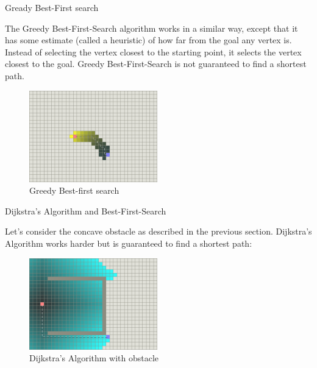 \documentclass[ignorenonframetext,]{beamer}
\begin{document}
\begin{frame}{Gready Best-First search}
\protect\hypertarget{gready-best-first-search}{}

The Greedy Best-First-Search algorithm works in a similar way, except
that it has some estimate (called a heuristic) of how far from the goal
any vertex is. Instead of selecting the vertex closest to the starting
point, it selects the vertex closest to the goal. Greedy
Best-First-Search is not guaranteed to find a shortest path.

\begin{figure}
\centering
\includegraphics[width=\textwidth,height=1.5625in]{best-first-search.png}
\caption{Greedy Best-first search}
\end{figure}

\end{frame}

\begin{frame}{Dijkstra's Algorithm and Best-First-Search}
\protect\hypertarget{dijkstras-algorithm-and-best-first-search}{}

Let's consider the concave obstacle as described in the previous
section. Dijkstra's Algorithm works harder but is guaranteed to find a
shortest path:

\begin{figure}
\centering
\includegraphics[width=\textwidth,height=1.5625in]{dijkstra-trap.png}
\caption{Dijkstra's Algorithm with obstacle}
\end{figure}

\end{frame}
\end{document}
